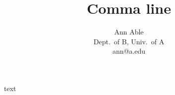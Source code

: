 \documentclass{article}
\begin{document}
\title{Comma line}
\author{Ann Able \\ Dept.\ of B, Univ.\ of A \\ ann@a.edu}
\date{}
\maketitle
text
\end{document}
